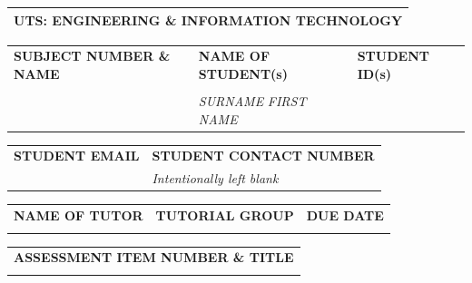 \documentclass[a4paper,12pt]{article}
\begin{document}
\hspace{1pt}

\noindent
\begin{tabularx}{\textwidth}{|Y|}
	\hline
	\textbf{UTS: ENGINEERING \& INFORMATION TECHNOLOGY} \\
	\hline
\end{tabularx}
\begin{tabularx}{\textwidth}{|Y|Y|Y|}
	\hline
	\textbf{SUBJECT NUMBER \& NAME} & \textbf{NAME OF STUDENT(s)}                                       & \textbf{STUDENT ID(s)} \\
	                                &                                                                   &                        \\
	                                & \tiny\textit{SURNAME} \hspace{30pt}\tiny\textit{FIRST NAME}\hfill &                        \\
	\hline
\end{tabularx}
\begin{tabularx}{\textwidth}{|Y|Y|}
	\hline
	\textbf{STUDENT EMAIL} & \textbf{STUDENT CONTACT NUMBER} \\
	\vspace{1pt}
	\vspace{10pt}
	                       &
	\vspace{1pt}
	\textit{Intentionally left blank}

	\vspace{10pt}                                            \\

	\hline
\end{tabularx}
\begin{tabularx}{\textwidth}{|Y|Y|Y|}
	\hline
	\textbf{NAME OF TUTOR} & \textbf{TUTORIAL GROUP} & \textbf{DUE DATE} \\
	\vspace{1pt}
	\vspace{10pt}
	                       &
	\vspace{1pt}
	\vspace{10pt}
	                       &
	\vspace{1pt}
	\vspace{10pt}                                                        \\
	\hline
\end{tabularx}
\begin{tabularx}{\textwidth}{|Y|}
	\hline
	\textbf{ASSESSMENT ITEM NUMBER \& TITLE} \\

	\vspace{1pt}
	\vspace{10pt}
	\\
	\hline
\end{tabularx}
\end{document}
